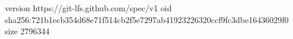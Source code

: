version https://git-lfs.github.com/spec/v1
oid sha256:721b1ecb354d68e71f514cb2f5e7297ab41923226320ccf9fc3dbe16436029f0
size 2796344
